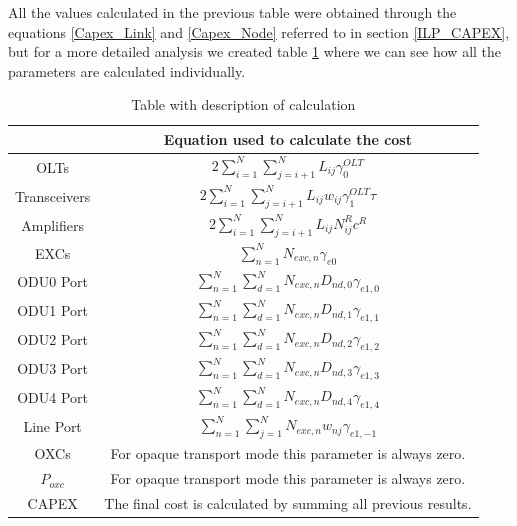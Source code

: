\vspace{17pt}
All the values calculated in the previous table were obtained through the equations \ref{Capex_Link} and \ref{Capex_Node} referred to in section \ref{ILP_CAPEX}, but for a more detailed analysis we created table \ref{formulas_opaque} where we can see how all the parameters are calculated individually.\\
\newpage
\begin{table}[h!]
\centering
\begin{tabular}{|| c | c ||}
 \hline
  & Equation used to calculate the cost \\ \hline
 OLTs & \(\displaystyle 2 \sum_{i=1}^{N}\sum_{j=i+1}^{N} L_{ij} \gamma_0^{OLT} \) \\ \hline
 Transceivers & \(\displaystyle 2 \sum_{i=1}^{N}\sum_{j=i+1}^{N} L_{ij} w_{ij} \gamma_1^{OLT} \tau \) \\ \hline
 Amplifiers & \(\displaystyle 2 \sum_{i=1}^{N}\sum_{j=i+1}^{N} L_{ij} N^R_{ij} c^R \) \\ \hline
 EXCs & \(\displaystyle \sum_{n=1}^N N_{exc,n} \gamma_{e0} \) \\ \hline
 ODU0 Port & \(\displaystyle \sum_{n=1}^{N} \sum_{d=1}^{N} N_{exc,n} D_{nd,0} \gamma_{e1,0} \) \\ \hline
 ODU1 Port & \(\displaystyle \sum_{n=1}^{N} \sum_{d=1}^{N} N_{exc,n} D_{nd,1} \gamma_{e1,1} \) \\ \hline
 ODU2 Port & \(\displaystyle \sum_{n=1}^{N} \sum_{d=1}^{N} N_{exc,n} D_{nd,2} \gamma_{e1,2} \)\\ \hline
 ODU3 Port & \(\displaystyle \sum_{n=1}^{N} \sum_{d=1}^{N} N_{exc,n} D_{nd,3} \gamma_{e1,3} \) \\ \hline
 ODU4 Port & \(\displaystyle \sum_{n=1}^{N} \sum_{d=1}^{N} N_{exc,n} D_{nd,4} \gamma_{e1,4} \) \\ \hline
 Line Port & \(\displaystyle \sum_{n=1}^{N} \sum_{j=1}^{N} N_{exc,n} w_{nj} \gamma_{e1,-1} \) \\ \hline
 OXCs & For opaque transport mode this parameter is always zero. \\ \hline
 $P_{oxc}$ & For opaque transport mode this parameter is always zero. \\ \hline
 CAPEX & The final cost is calculated by summing all previous results. \\
 \hline
 \end{tabular}
\caption{Table with description of calculation}
\label{formulas_opaque}
\end{table}



